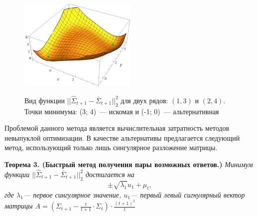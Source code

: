 \documentclass{article}
\begin{document}
\begin{figure}[H]
	\centering
	\begin{center}
		\includegraphics[width=0.5\textwidth]{CorrelationError}
		\label{fig:fig5}
	\end{center}
	\caption{Вид функции $||\hat{\Sigma}_{t+1} - \bar{\Sigma}_{t+1}||_2^2$ для двух рядов: $(1, 3)$ и $(2, 4)$. Точки минимума: (3; 4)~--- искомая и (-1; 0)~--- альтернативная}
\end{figure}


Проблемой данного метода является вычислительная затратность методов невыпуклой оптимизации. В качестве альтернативы предлагается следующий метод, использующий только лишь сингулярное разложение матрицы.

\textbf{Теорема 3. (Быстрый метод получения пары возможных ответов.)} \textit{Минимум функции $||\hat{\Sigma}_{t+1} - \bar{\Sigma}_{t+1}||_2^2$ достигается на \[\pm\sqrt{\lambda_1} u_1 + \mu_t,\] где $\lambda_1$--- первое сингулярное значение, $u_1$--- первый левый сигнулярный вектор матрицы $A=\left(\Sigma_{t+1} - \frac{t}{t+1} \cdot \Sigma_t \right) \cdot \frac{(t+1)^2}{t}$}
\end{document}
